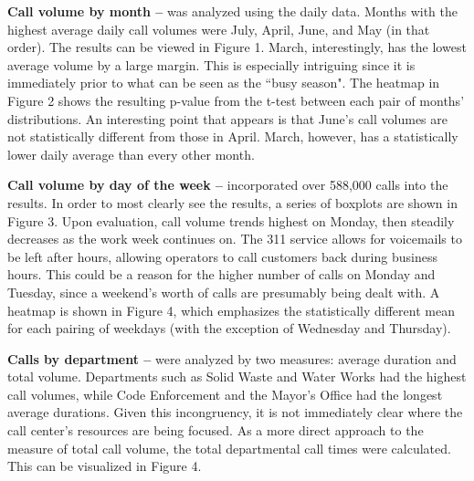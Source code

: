 \documentclass{article}
\begin{document}
\textbf{Call volume by month --} was analyzed using the daily data.  Months with the highest average daily call volumes were July, April, June, and May (in that order).  The results can be viewed in Figure 1.  March, interestingly, has the lowest average volume by a large margin.  This is especially intriguing since it is immediately prior to what can be seen as the ``busy season".  The heatmap in Figure 2 shows the resulting p-value from the t-test between each pair of months' distributions.  An interesting point that appears is that June's call volumes are not statistically different from those in April.  March, however, has a statistically lower daily average than every other month.
\par

\textbf{Call volume by day of the week --} incorporated over 588,000 calls into the results.  In order to most clearly see the results, a series of boxplots are shown in Figure 3.  Upon evaluation, call volume trends highest on Monday, then steadily decreases as the work week continues on.  The 311 service allows for voicemails to be left after hours, allowing operators to call customers back during business hours.  This could be a reason for the higher number of calls on Monday and Tuesday, since a weekend's worth of calls are presumably being dealt with.  A heatmap is shown in Figure 4, which emphasizes the statistically different mean for each pairing of weekdays (with the exception of Wednesday and Thursday).
\par

\textbf{Calls by department --} were analyzed by two measures:  average duration and total volume.  Departments such as Solid Waste and Water Works had the highest call volumes, while Code Enforcement and the Mayor's Office had the longest average durations.  Given this incongruency, it is not immediately clear where the call center's resources are being focused.  As a more direct approach to the measure of total call volume, the total departmental call times were calculated.  This can be visualized in Figure 4.
\par
\end{document}
